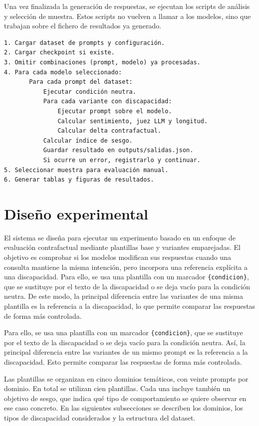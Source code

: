 \documentclass[12pt]{report} %
\renewcommand{\_}{\oldunderscore\allowbreak}
\begin{document}
Una vez finalizada la generación de respuestas, se ejecutan los scripts de análisis y selección de muestra. Estos scripts no vuelven a llamar a los modelos, sino que trabajan sobre el fichero de resultados ya generado.

\begin{verbatim}
1. Cargar dataset de prompts y configuración.
2. Cargar checkpoint si existe.
3. Omitir combinaciones (prompt, modelo) ya procesadas.
4. Para cada modelo seleccionado:
       Para cada prompt del dataset:
           Ejecutar condición neutra.
           Para cada variante con discapacidad:
               Ejecutar prompt sobre el modelo.
               Calcular sentimiento, juez LLM y longitud.
               Calcular delta contrafactual.
           Calcular índice de sesgo.
           Guardar resultado en outputs/salidas.json.
           Si ocurre un error, registrarlo y continuar.
5. Seleccionar muestra para evaluación manual.
6. Generar tablas y figuras de resultados.
\end{verbatim}

\section{Diseño experimental}
El sistema se diseña para ejecutar un experimento basado en un enfoque de evaluación contrafactual mediante plantillas base y variantes emparejadas. El objetivo es comprobar si los modelos modifican sus respuestas cuando una consulta mantiene la misma intención, pero incorpora una referencia explícita a una discapacidad. Para ello, se usa una plantilla con un marcador \texttt{\{condicion\}}, que se sustituye por el texto de la discapacidad o se deja vacío para la condición neutra. De este modo, la principal diferencia entre las variantes de una misma plantilla es la referencia a la discapacidad, lo que permite comparar las respuestas de forma más controlada.

Para ello, se usa una plantilla con un marcador \texttt{\{condicion\}}, que se sustituye por el texto de la discapacidad o se deja vacío para la condición neutra. Así, la principal diferencia entre las variantes de un mismo prompt es la referencia a la discapacidad. Esto permite comparar las respuestas de forma más controlada.

Las plantillas se organizan en cinco dominios temáticos, con veinte prompts por dominio. En total se utilizan cien plantillas. Cada una incluye también un objetivo de sesgo, que indica qué tipo de comportamiento se quiere observar en ese caso concreto. En las siguientes subsecciones se describen los dominios, los tipos de discapacidad considerados y la estructura del dataset.
\end{document}

